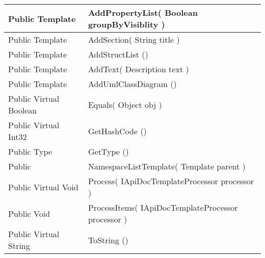 \documentclass[11pt, oneside, a4paper]{book}
\begin{document}
\begin{center}
\begin{tabular}{| p{3cm} | p{12cm} | }
 Public  Template &  AddPropertyList(\hypertarget{SoftwareEngineeringTools.{}Documentation.{}NamespaceListTemplate.{}AddPropertyList\_Boolean}{} Boolean  groupByVisiblity  )\\
\hline
 Public  Template &  AddSection(\hypertarget{SoftwareEngineeringTools.{}Documentation.{}NamespaceListTemplate.{}AddSection\_String}{} String  title  )\\
\hline
 Public  Template &  AddStructList ()\hypertarget{SoftwareEngineeringTools.{}Documentation.{}NamespaceListTemplate.{}AddStructList}{}\\
\hline
 Public  Template &  AddText(\hypertarget{SoftwareEngineeringTools.{}Documentation.{}NamespaceListTemplate.{}AddText\_Description}{} Description  text  )\\
\hline
 Public  Template &  AddUmlClassDiagram ()\hypertarget{SoftwareEngineeringTools.{}Documentation.{}NamespaceListTemplate.{}AddUmlClassDiagram}{}\\
\hline
 Public  Virtual  Boolean &  Equals(\hypertarget{SoftwareEngineeringTools.{}Documentation.{}NamespaceListTemplate.{}Equals\_Object}{} Object  obj  )\\
\hline
 Public  Virtual  Int32 &  GetHashCode ()\hypertarget{SoftwareEngineeringTools.{}Documentation.{}NamespaceListTemplate.{}GetHashCode}{}\\
\hline
 Public  Type &  GetType ()\hypertarget{SoftwareEngineeringTools.{}Documentation.{}NamespaceListTemplate.{}GetType}{}\\
\hline
 Public  &  NamespaceListTemplate(\hypertarget{SoftwareEngineeringTools.{}Documentation.{}NamespaceListTemplate.{}NamespaceListTemplate\_Template}{} Template  parent  )\\
\hline
 Public  Virtual  Void &  Process(\hypertarget{SoftwareEngineeringTools.{}Documentation.{}NamespaceListTemplate.{}Process\_IApiDocTemplateProcessor}{} IApiDocTemplateProcessor  processor  )\\
\hline
 Public  Void &  ProcessItems(\hypertarget{SoftwareEngineeringTools.{}Documentation.{}NamespaceListTemplate.{}ProcessItems\_IApiDocTemplateProcessor}{} IApiDocTemplateProcessor  processor  )\\
\hline
 Public  Virtual  String &  ToString ()\hypertarget{SoftwareEngineeringTools.{}Documentation.{}NamespaceListTemplate.{}ToString}{}\\
\hline
\end{tabular}
\end{center}
 
\end{document}
